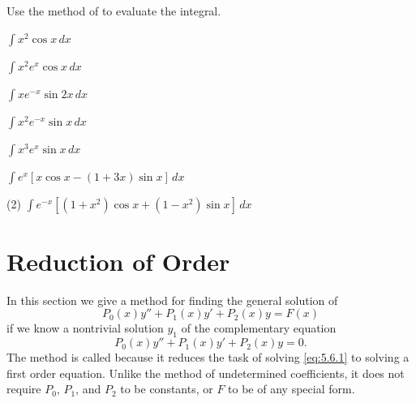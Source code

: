 \begin{exerciselist}
\item\label{exer:5.5.40}Use the method of  to evaluate the integral.
\begin{alist*}[columns=2]
\item $\int x^2\cos x\,dx$
\item $\int x^2e^x\cos x\,dx$
\item $\int xe^{-x}\sin2x\,dx$
\item $\int x^2e^{-x}\sin x\,dx$
\item $\int x^3e^x\sin x\,dx$
\item $\int e^x\left[x\cos x-(1+3x)\sin x\right]\,dx$
\item(2) $\int e^{-x}\left[(1+x^2)\cos x+(1-x^2)\sin x\right]\,dx$
\end{alist*}

\end{exerciselist}


\section{Reduction of Order}\label{sec:reduction_order}

In this section we give a method for finding the general
solution of
\begin{equation} \label{eq:5.6.1}
P_0(x)y''+P_1(x)y'+P_2(x)y=F(x)
\end{equation}
if we know  a nontrivial solution $y_1$ of the complementary equation
\begin{equation} \label{eq:5.6.2}
P_0(x)y''+P_1(x)y'+P_2(x)y=0.
\end{equation}
The method is called  because it reduces
the task of solving \eqref{eq:5.6.1} to solving a first order equation.
Unlike the method of undetermined coefficients, it does not require
$P_0$, $P_1$, and $P_2$ to be constants, or $F$ to be of any special
form.

